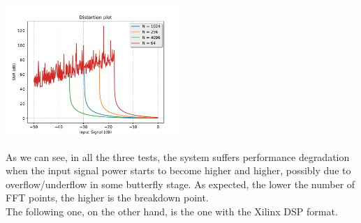 \documentclass[paper=a4, fontsize=12pt]{scrartcl} %
\numberwithin{equation}{section} %
\numberwithin{figure}{section} %
\numberwithin{table}{section} %
\begin{document}
\begin{minipage}{\textwidth}
    \centering
    \includegraphics[width = 0.5\textwidth]{../figQ15/TEST_2.pdf}
\end{minipage}

As we can see, in all the three tests, the system suffers performance degradation
when the input signal power starts to become higher and higher, possibly due to
overflow/underflow in some butterfly stage. As expected, the lower the
number of FFT points, the higher is the breakdown point.\\

The following one, on the other hand, is the one with the Xilinx DSP format.
\end{document}
